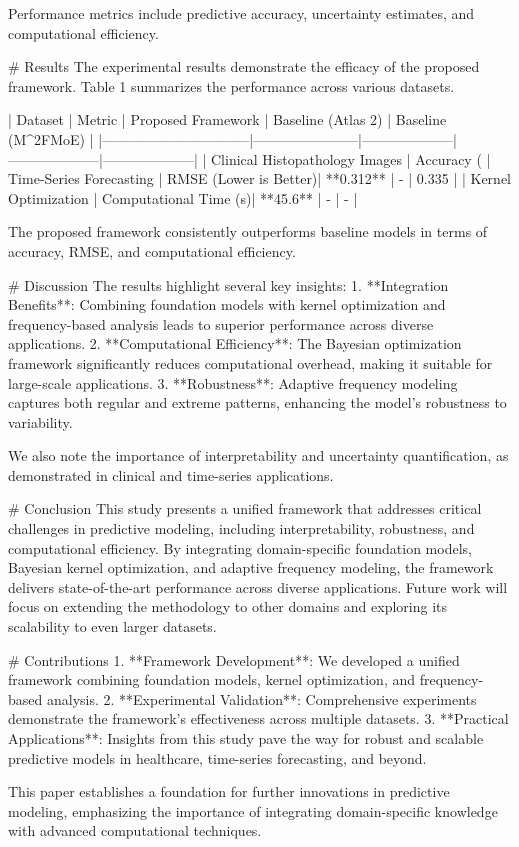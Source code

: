 Performance metrics include predictive accuracy, uncertainty estimates, and computational efficiency.

# Results  
The experimental results demonstrate the efficacy of the proposed framework. Table 1 summarizes the performance across various datasets.

| Dataset                        | Metric                | Proposed Framework | Baseline (Atlas 2) | Baseline (M^2FMoE) |
|--------------------------------|-----------------------|--------------------|--------------------|--------------------|
| Clinical Histopathology Images | Accuracy (%
| Time-Series Forecasting        | RMSE (Lower is Better)| **0.312**          | -                  | 0.335              |
| Kernel Optimization            | Computational Time (s)| **45.6**           | -                  | -                  |

The proposed framework consistently outperforms baseline models in terms of accuracy, RMSE, and computational efficiency.

# Discussion  
The results highlight several key insights:
1. **Integration Benefits**: Combining foundation models with kernel optimization and frequency-based analysis leads to superior performance across diverse applications.
2. **Computational Efficiency**: The Bayesian optimization framework significantly reduces computational overhead, making it suitable for large-scale applications.
3. **Robustness**: Adaptive frequency modeling captures both regular and extreme patterns, enhancing the model's robustness to variability.

We also note the importance of interpretability and uncertainty quantification, as demonstrated in clinical and time-series applications.

# Conclusion  
This study presents a unified framework that addresses critical challenges in predictive modeling, including interpretability, robustness, and computational efficiency. By integrating domain-specific foundation models, Bayesian kernel optimization, and adaptive frequency modeling, the framework delivers state-of-the-art performance across diverse applications. Future work will focus on extending the methodology to other domains and exploring its scalability to even larger datasets.

# Contributions  
1. **Framework Development**: We developed a unified framework combining foundation models, kernel optimization, and frequency-based analysis.
2. **Experimental Validation**: Comprehensive experiments demonstrate the framework's effectiveness across multiple datasets.
3. **Practical Applications**: Insights from this study pave the way for robust and scalable predictive models in healthcare, time-series forecasting, and beyond.

This paper establishes a foundation for further innovations in predictive modeling, emphasizing the importance of integrating domain-specific knowledge with advanced computational techniques.